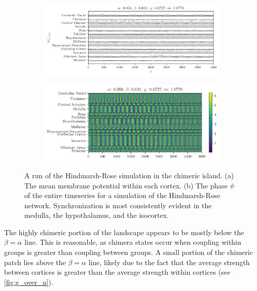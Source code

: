 \begin{figure}[ht]
  \centering
  \begin{subfigure}{\textwidth}
    \centering
    \includegraphics[width=\textwidth]{figure/means-0_058-0_010}
    \caption{}
    \label{fig:mean_058_010}
  \end{subfigure}
  \begin{subfigure}{\textwidth}
    \centering
    \includegraphics[width=\textwidth]{figure/overhead-0_058-0_010}
    \caption{}
    \label{fig:overhead_058_010}
  \end{subfigure}
  \caption[Highly chimeric simulation]{A run of the Hindmarsh-Rose simulation in the chimeric island.
    (a) The mean membrane potential within each cortex.
    (b) The phase $\phi$ of the entire timeseries for a simulation of the Hindmarsh-Rose network.
    Synchronization is most consistently evident in the medulla, the hypothalamus, and the isocortex.
  }
  \label{fig:058_010}
\end{figure}

The highly chimeric portion of the landscape appears to be mostly below the $\beta = \alpha$ line.
This is reasonable, as chimera states occur when coupling within groups is greater than coupling between groups.
A small portion of the chimeric patch lies above the $\beta = \alpha$ line, likely due to the fact that the average strength between cortices is greater than the average strength within cortices (see \cref{fig:g_over_n}).

